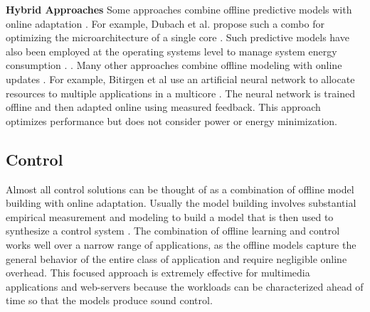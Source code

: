 \noindent \textbf{Hybrid Approaches}
Some approaches combine offline predictive models with online
adaptation
\cite{Zhang2012,packandcap,Winter2010,dubach2010,Koala,Cinder,
  wu2012inferred}.  For example, Dubach et al.  propose such a combo
for optimizing the microarchitecture of a single core
\cite{dubach2010}.  Such predictive models have also been employed at
the operating systems level to manage system energy consumption
\cite{Koala,Cinder}.  \cite{wu2012inferred}.  Many other approaches
combine offline modeling with online updates
\cite{JouleGuard,Bitirgen2008,Ipek}.  For example, Bitirgen et al use
an artificial neural network to allocate resources to multiple
applications in a multicore \cite{Bitirgen2008}.  The neural network
is trained offline and then adapted online using measured feedback.
This approach optimizes performance but does not consider power or
energy minimization.



\subsection{Control}
Almost all control solutions can be thought of as a combination of
offline model building with online adaptation.  Usually the model
building involves substantial empirical measurement and modeling to
build a model that is then used to synthesize a control system
\cite{Wu2004,TCST,Chen2011,PTRADE,POET,ControlWare,Agilos,Rajkumar,Sojka,Raghavendra2008}.
The combination of offline learning and control works well over a
narrow range of applications, as the offline models capture the
general behavior of the entire class of application and require
negligible online overhead.  This focused approach is extremely
effective for multimedia applications
\cite{grace2,flinn99,flinn2004,xtune,TCST} and web-servers
\cite{Horvarth,LuEtAl-2006a,SunDaiPan-2008a} because the workloads can
be characterized ahead of time so that the models produce sound
control.

